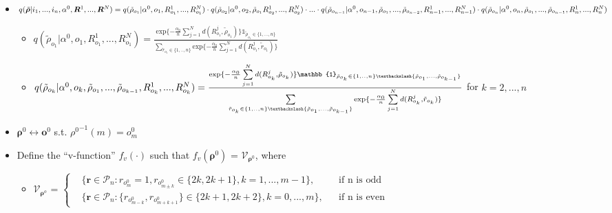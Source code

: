 \documentclass[11pt, oneside]{article}   	%
\begin{document}
\begin{itemize}
	\item {$q(\tilde{\bm{\rho}}|i_1, ..., i_n, \alpha^0, \bm{R}^1, ..., \bm{R}^N) \\
		=q(\tilde{\rho}_{o_1}|\alpha^0,o_1, R^1_{o_1},...,R^N_{o_1}) \cdot
		q(\tilde{\rho}_{o_2}|\alpha^0,o_2,\tilde{\rho}_{o_1} R^1_{o_2},...,R^N_{o_2}) \cdot
		... \cdot \\
		q(\tilde{\rho}_{o_{n-1}}|\alpha^0,o_{n-1}, \tilde{\rho}_{o_1},...,\tilde{\rho}_{o_{n-2}}, R^1_{n-1},...,R^N_{n-1}) \cdot
		q(\tilde{\rho}_{o_{n}}|\alpha^0,o_{n}, \tilde{\rho}_{o_1},...,\tilde{\rho}_{o_{n-1}}, R^1_n, ..., R^N_n)$}
	\begin{itemize}
	\item{	$ {q(\tilde{\rho}_{o_1}|\alpha^0, o_1,R^1_{o_1}, ...,R^N_{o_1}) }
	= \frac{\text{exp}\{- \frac{\alpha_0}{n}\sum\limits_{j=1}^{N}d(R^j_{o_1}, \tilde{\rho}_{o_1})\}\mathbb{1}_{\tilde{\rho}_{o_1}\in \{1, ...,n\}}}
	{\sum\limits_{\tilde{r}_{o_1}\in \{1, .., n\}}\text{exp}\{- \frac{\alpha_0}{n}\sum\limits_{j=1}^{N}d(R^j_{o_1}, \tilde{r}_{o_1})\}} $}

\item{
	$ {q(\tilde{\rho}_{o_k}|\alpha^0, o_k, \tilde{\rho}_{o_1}, ..., \tilde{\rho}_{o_{k-1}},R^1_{o_k}, ...,R^N_{o_k}) }
	= \frac{\text{exp}\{- \frac{\alpha_0}{n}\sum\limits_{j=1}^{N}d(R^j_{o_k}, \tilde{\rho}_{o_k})\}\mathbb{1}_{\tilde{\rho}_{o_k}\in\{1, .., n\}\textbackslash \{\tilde{\rho}_{o_1}, ..., \tilde{\rho}_{o_{k-1}}\}}}
	{\sum\limits_{\tilde{r}_{o_k}\in \{1, .., n\}\textbackslash \{\tilde{\rho}_{o_1}, ..., \tilde{\rho}_{o_{k-1}}\}}\text{exp}\{- \frac{\alpha_0}{n}\sum\limits_{j=1}^{N}d(R^j_{o_k}, \tilde{r}_{o_k})\}} $} for $k = 2, ..., n$

	\end{itemize}

	\item{ $\bm{\rho}^0 \leftrightarrow \bm{o}^0$ s.t. ${{\rho}^0}^{-1}(m) = o^0_m$}
	
	
	\item{Define the ``v-function'' $f_v(\cdot)$ such that $f_v(\bm{\rho}^0)$ = $\mathcal{V}_{\bm{\rho}^0}$}, where 
	\begin{itemize}
			\item{ $\mathcal{V}_{\bm{\rho}^o}$ = $
			\left \{ 
			\begin{aligned}
			&\{\bm{r}\in \mathcal{P}_n: r_{o^0_m}=1, r_{o^0_{m\pm k}} \in \{2k, 2k+1 \}, k = 1, ..., m-1 \}, && \text{if n is odd} \\
			&\{\bm{r}\in \mathcal{P}_n: \{r_{o^0_{m-k}},r_{o^0_{m+k+1}} \} \in \{2k+1, 2k+2 \}, k = 0, ..., m \}, && \text{if n is even} 
			\end{aligned} \right.
			$
		}
	\end{itemize}


\end{itemize}
\end{document}
